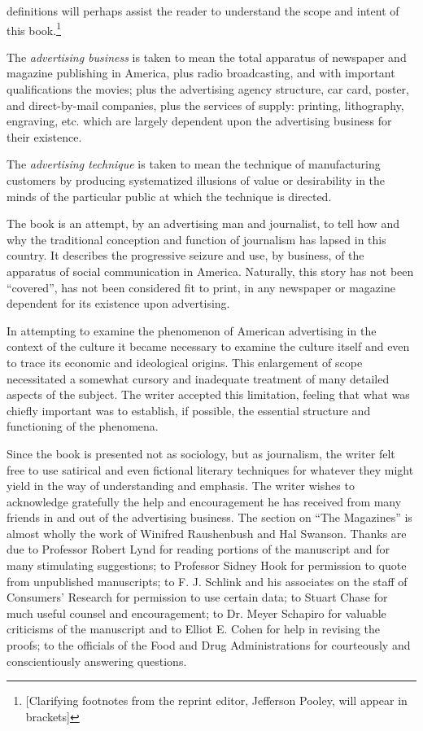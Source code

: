 \documentclass[twoside,nohyper,openany,nobib]{tufte-book}
\begin{document}
 definitions will perhaps assist the reader to 
understand the scope and intent of this book.\footnote{[Clarifying footnotes from the reprint editor, Jefferson Pooley, will appear in brackets]} 

The \emph{advertising business} is taken to mean the total apparatus of
newspaper and magazine publishing in America, plus radio broadcasting,
and with important qualifications the movies; plus the advertising
agency structure, car card, poster, and direct-by-mail companies, plus
the services of supply: printing, lithography, engraving, etc. which are
largely dependent upon the advertising business for their existence.

The \emph{advertising technique} is taken to mean the technique of
manufacturing customers by producing systematized illusions of value or
desirability in the minds of the particular public at which the
technique is directed.

The book is an attempt, by an advertising man and journalist, to tell
how and why the traditional conception and function of journalism has
lapsed in this country. It describes the progressive seizure and use, by
business, of the apparatus of social communication in America.
Naturally, this story has not been ``covered'', has not been considered
fit to print, in any newspaper or magazine dependent for its existence
upon advertising.

In attempting to examine the phenomenon of American advertising in the
context of the culture it became necessary to examine the culture itself
and even to trace its economic and ideological origins. This enlargement
of scope necessitated a somewhat cursory and inadequate treatment of
many detailed aspects of the subject. The writer accepted this
limitation, feeling that what was chiefly important was to establish, if
possible, the essential structure and functioning of the phenomena.

Since the book is presented not as sociology, but as journalism, the
writer felt free to use satirical and even fictional literary techniques
for whatever they might yield in the way of understanding and emphasis.
The writer wishes to acknowledge gratefully the help and encouragement
he has received from many friends in and out of the advertising
business. The section on ``The Magazines'' is almost wholly the work of
Winifred Raushenbush and Hal Swanson. Thanks are due to Professor Robert
Lynd for reading portions of the manuscript and for many stimulating
suggestions; to Professor Sidney Hook for permission to quote from
unpublished manuscripts; to F. J. Schlink and his associates on the
staff of Consumers' Research for permission to use certain data; to
Stuart Chase for much useful counsel and encouragement; to Dr. Meyer
Schapiro for valuable criticisms of the manuscript and to Elliot E.
Cohen for help in revising the proofs; to the officials of the Food and
Drug Administrations for courteously and conscientiously answering
questions.
\end{document}
